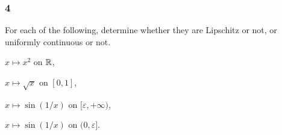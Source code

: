 \documentclass[../main.tex]{subfiles}
\begin{document}
\subsubsection*{4}
\begin{wts}
    For each of the following, determine whether they are Lipschitz or not, or uniformly continuous or not.
    \begin{enumalpha}
        \item $x\mapsto x^2$ on $\mathbb{R}$,
        \item $x\mapsto \sqrt{x}$ on $[0,1]$,
        \item $x\mapsto \sin(1/x)$ on $[\varepsilon,+\infty)$,
        \item $x\mapsto \sin(1/x)$ on $(0,\varepsilon]$.
    \end{enumalpha}
\end{wts}
\end{document}
